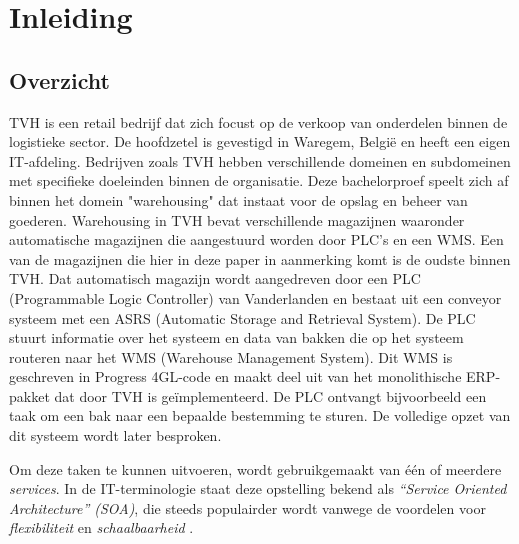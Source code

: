 



\section{Inleiding}%
\label{sec:inleiding}

\subsection{Overzicht}

TVH is een retail bedrijf dat zich focust op de verkoop van onderdelen binnen de logistieke sector. 
De hoofdzetel is gevestigd in Waregem, België en heeft een eigen IT-afdeling.
Bedrijven zoals TVH hebben verschillende domeinen en subdomeinen met specifieke doeleinden binnen de organisatie. 
Deze bachelorproef speelt zich af binnen het domein "warehousing" dat instaat voor de opslag en beheer van goederen. 
Warehousing in TVH bevat verschillende magazijnen waaronder automatische magazijnen die aangestuurd worden door PLC's en een WMS.
Een van de magazijnen die hier in deze paper in aanmerking komt is de oudste binnen TVH. 
Dat automatisch magazijn wordt aangedreven door een PLC (Programmable Logic Controller) 
van Vanderlanden en bestaat uit een conveyor systeem met een ASRS (Automatic Storage and Retrieval System).
De PLC stuurt informatie over het systeem en data van bakken die op het systeem routeren naar het WMS (Warehouse Management System). 
Dit WMS is geschreven in Progress 4GL-code en maakt deel uit van het monolithische ERP-pakket dat door TVH is geïmplementeerd. 
De PLC ontvangt bijvoorbeeld een taak om een bak naar een bepaalde bestemming te sturen. 
De volledige opzet van dit systeem wordt later besproken.

Om deze taken te kunnen uitvoeren, wordt gebruikgemaakt van één of meerdere \emph{services}. 
In de IT-terminologie staat deze opstelling bekend als \emph{“Service Oriented Architecture” (SOA)}, 
die steeds populairder wordt vanwege de voordelen voor \emph{flexibiliteit} en \emph{schaalbaarheid} \autocite{Bellemare2020}.

